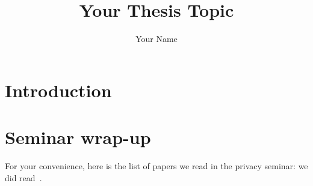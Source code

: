 \documentclass[twocolumn, a4paper, 10pt]{article}
\begin{document}
\title{\Large Your Thesis Topic}

\author{
	Your Name
}

\maketitle

\def\abstractname{{\textbf Abstract}}
\begin{abstract}
{
\bfseries
}
\end{abstract}


\section{Introduction}
\lipsum[1-3]


\section{Seminar wrap-up}
For your convenience, here is the list of papers we read in the privacy seminar: we did read~\cite{
solove2011privacy,
brin1999transparent,
oulasvirta2012long,
chaum1985security,
narayanan2013happened1,
narayanan2013happened2,
chaum1981untraceable,
dingeldine2004tor,
wolinsky2013hang,
juarez2014critical,
Mor2015bloom4,
yekhanin2010private,
camenisch2012electronic,
gervais2014privacy,
bonneau2014mixcoin,
starov2015measuring,
sweeney2002k,
nissenbaum2011contextual,
nissenbaum2004privacy,
narayanan2011link,
dwork2011differential,
homer2008resolving,
kelley2009nutrition,
reznichenko2014private,
kaptein2012rethinking,
afroz2014doppelganger,
chaum2004secret,
acquisti2015privacy,
jagatic2007social,
kang2011self}.


\appendix
\end{document}
